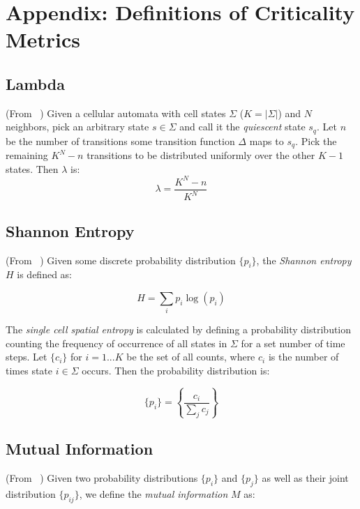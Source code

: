 \documentclass[a4paper,11pt]{article}
\begin{document}
\processdelayedfloats

\section{Appendix: Definitions of Criticality Metrics}
\label{app:Defs}

\subsection{Lambda}
\label{appA:lambda}
(From \citeauthor{la90}~\cite{la90}) Given a cellular automata with cell states $\Sigma$ ($K = |\Sigma|$) and $N$ neighbors, pick an arbitrary state $s \in \Sigma$ and call it the \textit{quiescent} state $s_q$. Let $n$ be the number of transitions some transition function $\Delta$ maps to $s_q$. Pick the remaining $K^N - n$ transitions to be distributed uniformly over the other $K-1$ states. Then $\lambda$ is:
\begin{equation}
\lambda = \frac{K^N - n}{K^N} 
\end{equation}

\subsection{Shannon Entropy}
\label{appA:entrop}
(From \citeauthor{li90b}~\cite{li90b}) Given some discrete probability distribution $\{p_i\}$, the \textit{Shannon entropy} $H$ is defined as:

\begin{equation}
H = \sum_i p_i \log(p_i)
\end{equation}

The \textit{single cell spatial entropy} is calculated by defining a probability distribution counting the frequency of occurrence of all states in $\Sigma$ for a set number of time steps. Let $\{c_i\}$ for $i = 1...K$ be the set of all counts, where $c_i$ is the number of times state $i \in \Sigma$ occurs. Then the probability distribution is:

\begin{equation}
\{p_i\} = \left\{\frac{c_i}{\sum_j c_j}\right\}
\end{equation}

\subsection{Mutual Information}
\label{appA:mut_info}
(From \citeauthor{li90b}~\cite{li90b}) Given two probability distributions $\{p_i\}$ and $\{p_j\}$ as well as their joint distribution $\{p_{ij}\}$, we define the \textit{mutual information} $M$ as:
\end{document}
